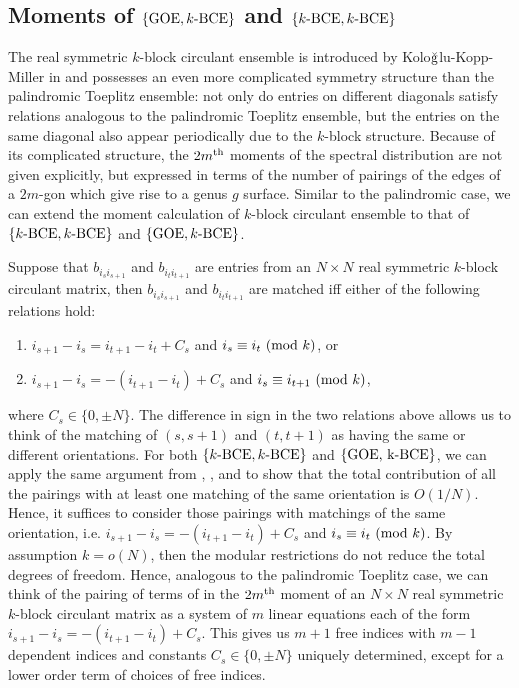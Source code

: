 \documentclass[11pt,reqno]{amsart}
\numberwithin{equation}{section}
\theoremstyle{plain}
\begin{document}
\subsection{Moments of $\{\textup{GOE}, k\textup{-BCE}\}$ and $\{k\textup{-BCE}, k\textup{-BCE}\}$}

The real symmetric $k$-block circulant ensemble is introduced by Kolo$\breve{{\rm g}}$lu-Kopp-Miller in \cite{Block Circulant} and possesses an even more complicated symmetry structure than the palindromic Toeplitz ensemble: not only do entries on different diagonals satisfy relations analogous to the palindromic Toeplitz ensemble, but the entries on the same diagonal also appear periodically due to the $k$-block structure. Because of its complicated structure, the $2m\textsuperscript{th}$ moments of the spectral distribution are not given explicitly, but expressed in terms of the number of pairings of the edges of a $2m$-gon which give rise to a genus $g$ surface. Similar to the palindromic case, we can extend the moment calculation of $k$-block circulant ensemble to that of $\{k\textup{-BCE}, k\textup{-BCE}\}$ and $\{\textup{GOE}, k\textup{-BCE}\}$.

Suppose that $b_{i_si_{s+1}}$ and $b_{i_ti_{t+1}}$ are entries from an $N\times N$ real symmetric $k$-block circulant matrix, then $b_{i_si_{s+1}}$ and $b_{i_ti_{t+1}}$ are matched iff either of the following relations hold:
\begin{enumerate}
\item $i_{s+1}-i_s=i_{t+1}-i_t+C_s$ and $i_s\equiv i_{t}\textup{ (mod $k$)}$, or
\item $i_{s+1}-i_s=-(i_{t+1}-i_t)+C_s$ and $i_s\equiv i_{t+1}\textup{ (mod $k$)}$,
\end{enumerate}
where $C_s\in \{0, \pm N\}$. The difference in sign in the two relations above allows us to think of the matching of $(s,s+1)$ and $(t,t+1)$ as having the same or different orientations. For both $\{k\textup{-BCE}, k\textup{-BCE}\}$ and $\{\textup{GOE, k\textup{-BCE}}\}$, we can apply the same argument from \cite{Toeplitz}, \cite{palindromicToeplitz}, and \cite{Block Circulant} to show that the total contribution of all the pairings with at least one matching of the same orientation is $O(1/N)$. Hence, it suffices to consider those pairings with matchings of the same orientation, i.e. $i_{s+1}-i_s=-(i_{t+1}-i_t)+C_s$ and $i_s\equiv i_t\textup{ (mod $k$)}$. By assumption $k=o(N)$, then the modular restrictions do not reduce the total degrees of freedom. Hence, analogous to the palindromic Toeplitz case, we can think of the pairing of terms of in the $2m\textsuperscript{th}$ moment of an $N\times N$ real symmetric $k$-block circulant matrix as a system of $m$ linear equations each of the form $i_{s+1}-i_s=-(i_{t+1}-i_t)+C_s$. This gives us $m+1$ free indices with $m-1$ dependent indices and constants $C_{s}\in \{0,\pm N\}$ uniquely determined, except for a lower order term of choices of free indices.
\end{document}
